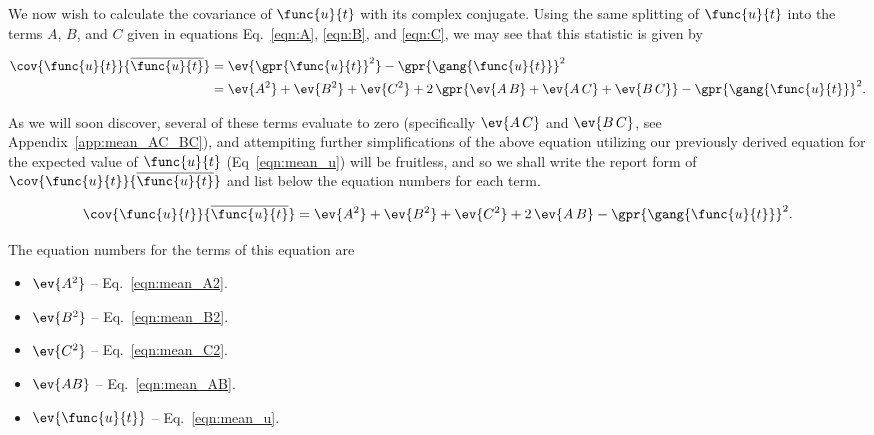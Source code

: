 We now wish to calculate the covariance of $\func{u}{t}$ with its complex conjugate. Using the same splitting of $\func{u}{t}$ into the terms $A$, $B$, and $C$ given in equations Eq.~\ref{eqn:A}, \ref{eqn:B}, and \ref{eqn:C}, we may see that this statistic is given by

\begin{align}
    \cov{\func{u}{t}}{\overline{\func{u}{t}}} &= \ev{\gpr{\func{u}{t}}^2} - \gpr{\gang{\func{u}{t}}}^2 \\
    	&= \ev{A^2} + \ev{B^2} + \ev{C^2} + 2\,\gpr{\ev{A\,B} + \ev{A\,C} + \ev{B\,C}} - \gpr{\gang{\func{u}{t}}}^2.
\end{align}

As we will soon discover, several of these terms evaluate to zero (specifically $\ev{A\,C}$ and $\ev{B\,C}$, see Appendix~\ref{app:mean_AC_BC}), and attempiting further simplifications of the above equation utilizing our previously derived equation for the expected value of $\func{u}{t}$ (Eq~\ref{eqn:mean_u}) will be fruitless, and so we shall write the report form of $\cov{\func{u}{t}}{\overline{\func{u}{t}}}$ and list below the equation numbers for each term.

\begin{equation}
    \cov{\func{u}{t}}{\overline{\func{u}{t}}} = \ev{A^2} + \ev{B^2} + \ev{C^2} + 2\,\ev{A\,B} - \gpr{\gang{\func{u}{t}}}^2. \label{eqn:cov_u_conjgu}
\end{equation}

The equation numbers for the terms of this equation are

\begin{itemize}
	\item [] $\ev{A^2}$ -- Eq.~\ref{eqn:mean_A2}.
	\item [] $\ev{B^2}$ -- Eq.~\ref{eqn:mean_B2}.
	\item [] $\ev{C^2}$ -- Eq.~\ref{eqn:mean_C2}.
	\item [] $\ev{AB}$ -- Eq.~\ref{eqn:mean_AB}.
	\item [] $\ev{\func{u}{t}}$ -- Eq.~\ref{eqn:mean_u}.
\end{itemize}

